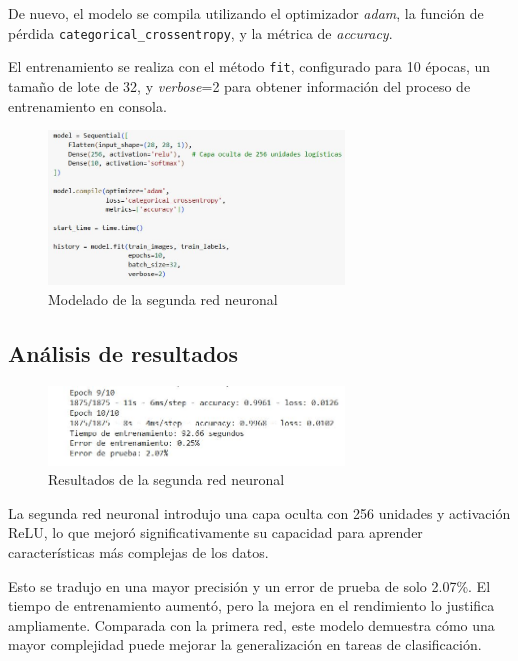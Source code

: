 De nuevo, el modelo se compila utilizando el optimizador \textit{adam}, la función de pérdida \texttt{categorical\_crossentropy}, y la métrica de \textit{accuracy}.

El entrenamiento se realiza con el método \texttt{fit}, configurado para 10 épocas, un tamaño de lote de 32, y \textit{verbose}=2 para obtener información del proceso de entrenamiento en consola.

\begin{figure}[H]
	\centering
	\includegraphics[width=0.7\textwidth]{imgs/model-red2.JPG}
	\caption{Modelado de la segunda red neuronal}
	\label{fig:model-red2}
\end{figure}

\subsection{Análisis de resultados}

\begin{figure}[H]
	\centering
	\includegraphics[width=0.7\textwidth]{imgs/results-red2.JPG}
	\caption{Resultados de la segunda red neuronal}
	\label{fig:results-red2}
\end{figure}

La segunda red neuronal introdujo una capa oculta con 256 unidades y activación ReLU, lo que mejoró significativamente su capacidad para aprender características más complejas de los datos.

Esto se tradujo en una mayor precisión y un error de prueba de solo 2.07\%. El tiempo de entrenamiento aumentó, pero la mejora en el rendimiento lo justifica ampliamente. Comparada con la primera red, este modelo demuestra cómo una mayor complejidad puede mejorar la generalización en tareas de clasificación.

